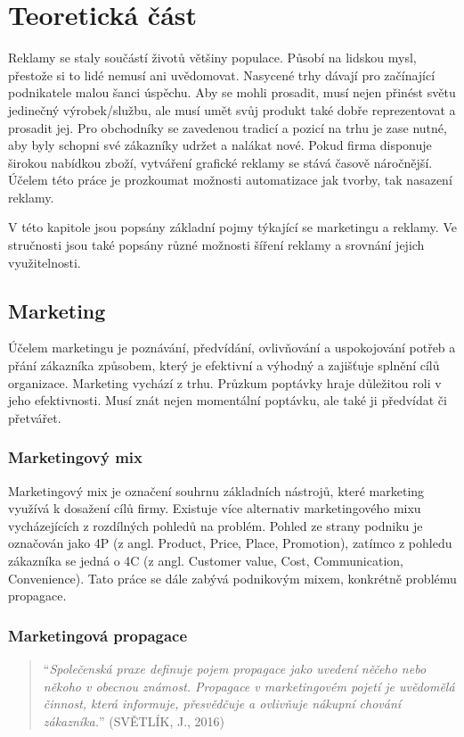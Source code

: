 \chapter{Teoretická část}
\label{chap:theoretical}
Reklamy se staly součástí životů většiny populace. Působí na lidskou mysl, přestože si to lidé nemusí ani uvědomovat.
Nasycené trhy dávají pro začínající podnikatele malou šanci úspěchu. Aby se mohli prosadit, musí nejen přinést světu jedinečný výrobek/službu,
ale musí umět svůj produkt také dobře reprezentovat a prosadit jej. Pro obchodníky se zavedenou tradicí a pozicí na trhu je zase nutné,
aby byly schopni své zákazníky udržet a nalákat nové. Pokud firma disponuje širokou nabídkou zboží,
vytváření grafické reklamy se stává časově náročnější.
Účelem této práce je prozkoumat možnosti automatizace jak tvorby, tak nasazení reklamy. 

V této kapitole jsou popsány základní pojmy týkající se marketingu a reklamy. Ve stručnosti jsou také popsány různé možnosti šíření reklamy
a srovnání jejich využitelnosti.

\section{Marketing}
\label{sec:marketing}
Účelem marketingu je poznávání, předvídání, ovlivňování a uspokojování potřeb a přání zákazníka způsobem, který je efektivní a výhodný a zajišťuje splnění
cílů organizace. Marketing vychází z trhu. Průzkum poptávky hraje důležitou roli v jeho efektivnosti.
Musí znát nejen momentální poptávku, ale také ji předvídat či přetvářet.

    \subsection{Marketingový mix}\label{ssec:marketing-mix}
    Marketingový mix je označení souhrnu základních nástrojů, které marketing využívá k dosažení cílů firmy.
    Existuje více alternativ marketingového mixu vycházejících z rozdílných pohledů na problém.
    Pohled ze strany podniku je označován jako 4P (z angl. Product, Price, Place, Promotion),
    zatímco z pohledu zákazníka se jedná o 4C (z angl. Customer value, Cost, Communication, Convenience).
    Tato práce se dále zabývá podnikovým mixem, konkrétně problému propagace.

    \subsection{Marketingová propagace}\label{ssec:marketing-propagation}
    \begin{quote}
        \enquote{\emph{Společenská praxe definuje pojem propagace jako uvedení něčeho nebo někoho v obecnou známost.
        Propagace v marketingovém pojetí je uvědomělá činnost, která informuje, přesvědčuje a ovlivňuje nákupní chování zákazníka.}}
        (SVĚTLÍK, J., 2016) \cite{svetlik:marketing}
        \end{quote}


